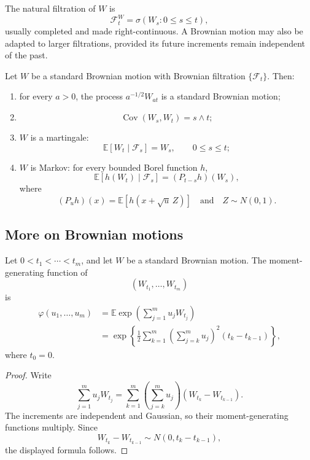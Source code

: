 \begin{remark}
The natural filtration of $W$ is
\[
\mathcal{F}_t^W=\sigma(W_s:0\leq s\leq t),
\]
usually completed and made right-continuous. A Brownian motion may also be adapted to larger filtrations, provided its future increments remain independent of the past.
\end{remark}

\begin{thm}
Let $W$ be a standard Brownian motion with Brownian filtration $\{\mathcal{F}_t\}$. Then:
\begin{enumerate}
    \item for every $a>0$, the process $a^{-1/2}W_{at}$ is a standard Brownian motion;
    \item
    \[
    \operatorname{Cov}(W_s,W_t)=s\wedge t;
    \]
    \item $W$ is a martingale:
    \[
    \mathbb{E}[W_t\mid\mathcal{F}_s]=W_s,
    \qquad 0\leq s\leq t;
    \]
    \item $W$ is Markov: for every bounded Borel function $h$,
    \[
    \mathbb{E}[h(W_t)\mid\mathcal{F}_s]
    =
    (P_{t-s}h)(W_s),
    \]
    where
    \[
    (P_u h)(x)=\mathbb{E}[h(x+\sqrt{u}\,Z)]
    \quad\text{and}\quad Z\sim N(0,1).
    \]
\end{enumerate}
\end{thm}

\subsection{More on Brownian motions}

\begin{thm}
Let $0<t_1<\cdots<t_m$, and let $W$ be a standard Brownian motion. The moment-generating function of
\[
(W_{t_1},\ldots,W_{t_m})
\]
is
\[
\begin{aligned}
\varphi(u_1,\ldots,u_m)
&=
\mathbb{E}\exp\left(\sum_{j=1}^m u_jW_{t_j}\right)\\
&=
\exp\left\{
\frac12\sum_{k=1}^m
\left(\sum_{j=k}^m u_j\right)^2(t_k-t_{k-1})
\right\},
\end{aligned}
\]
where $t_0=0$.
\end{thm}

\begin{proof}
Write
\[
\sum_{j=1}^m u_jW_{t_j}
=
\sum_{k=1}^m
\left(\sum_{j=k}^m u_j\right)(W_{t_k}-W_{t_{k-1}}).
\]
The increments are independent and Gaussian, so their moment-generating functions multiply. Since
\[
W_{t_k}-W_{t_{k-1}}\sim N(0,t_k-t_{k-1}),
\]
the displayed formula follows.
\end{proof}

